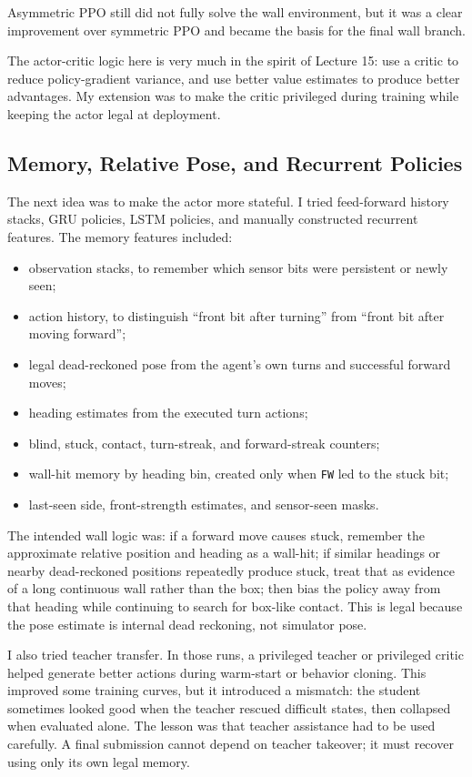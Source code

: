 \documentclass[11pt]{article}
\begin{document}
Asymmetric PPO still did not fully solve the wall environment, but it was a clear
improvement over symmetric PPO and became the basis for the final wall branch.

The actor-critic logic here is very much in the spirit of Lecture 15: use a critic to
reduce policy-gradient variance, and use better value estimates to produce better
advantages. My extension was to make the critic privileged during training while keeping
the actor legal at deployment.

\subsection{Memory, Relative Pose, and Recurrent Policies}

The next idea was to make the actor more stateful. I tried feed-forward history stacks,
GRU policies, LSTM policies, and manually constructed recurrent features. The memory
features included:
\begin{itemize}[leftmargin=1.5em]
  \item observation stacks, to remember which sensor bits were persistent or newly seen;
  \item action history, to distinguish ``front bit after turning'' from ``front bit after
  moving forward'';
  \item legal dead-reckoned pose from the agent's own turns and successful forward moves;
  \item heading estimates from the executed turn actions;
  \item blind, stuck, contact, turn-streak, and forward-streak counters;
  \item wall-hit memory by heading bin, created only when \texttt{FW} led to the stuck
  bit;
  \item last-seen side, front-strength estimates, and sensor-seen masks.
\end{itemize}

The intended wall logic was: if a forward move causes stuck, remember the approximate
relative position and heading as a wall-hit; if similar headings or nearby dead-reckoned
positions repeatedly produce stuck, treat that as evidence of a long continuous wall
rather than the box; then bias the policy away from that heading while continuing to
search for box-like contact. This is legal because the pose estimate is internal dead
reckoning, not simulator pose.

I also tried teacher transfer. In those runs, a privileged teacher or privileged critic
helped generate better actions during warm-start or behavior cloning. This improved
some training curves, but it introduced a mismatch: the student sometimes looked good
when the teacher rescued difficult states, then collapsed when evaluated alone. The
lesson was that teacher assistance had to be used carefully. A final submission cannot
depend on teacher takeover; it must recover using only its own legal memory.
\end{document}
